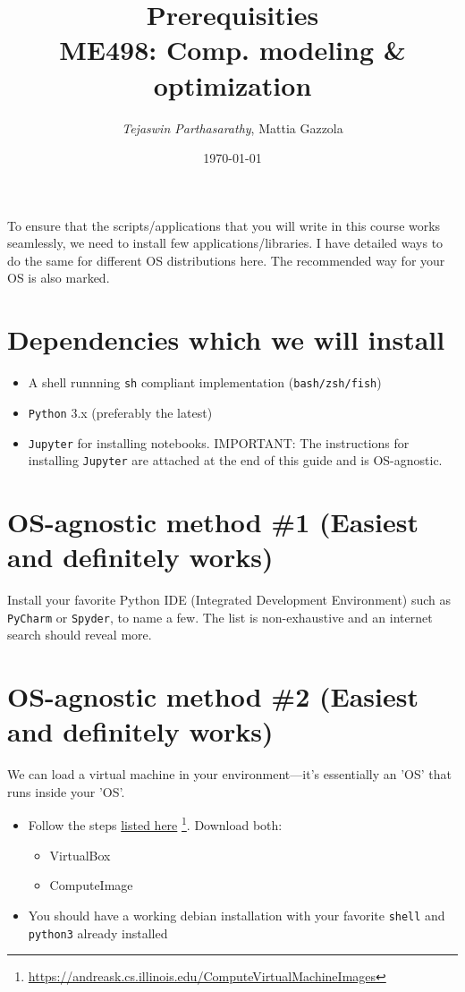 \documentclass[11pt]{article}
\author{\emph{Tejaswin Parthasarathy}, Mattia Gazzola}
\date{\today}
\title{Prerequisities\\\medskip
\large ME498: Comp. modeling \& optimization}
\begin{document}
\maketitle
To ensure that the scripts/applications that you will write in this course works
seamlessly, we need to install few applications/libraries. I have detailed ways
to do the same for different OS distributions here. The recommended way for your
OS is also marked.

\section*{Dependencies which we will install}
\label{sec:orgf10cae7}
\begin{itemize}
\item A shell runnning \texttt{sh} compliant implementation (\texttt{bash/zsh/fish})
\item \texttt{Python} 3.x (preferably the latest)
\item \texttt{Jupyter} for installing notebooks. IMPORTANT: The instructions for installing
\texttt{Jupyter} are attached at the end of this guide and is OS-agnostic.
\end{itemize}

\section*{OS-agnostic method \#1 (Easiest and definitely works)}
\label{sec:orgcf2bf2d}
Install your favorite Python IDE (Integrated Development Environment) such as
\texttt{PyCharm} or \texttt{Spyder}, to name a few. The list is non-exhaustive and an internet search
should reveal more.
\section*{OS-agnostic method \#2 (Easiest and definitely works)}
\label{sec:org6c3df1d}
We can load a virtual machine in your environment---it's essentially an 'OS' that
runs inside your 'OS'.
\begin{itemize}
\item Follow the steps \href{https://andreask.cs.illinois.edu/ComputeVirtualMachineImages}{listed here} \footnote{\url{https://andreask.cs.illinois.edu/ComputeVirtualMachineImages}}. Download both:
\label{sec:org5fedc5a}
\begin{itemize}
\item VirtualBox
\label{sec:orgfde6a76}
\item ComputeImage
\label{sec:orgdc8de05}
\end{itemize}
\item You should have a working debian installation with your favorite
\label{sec:orgadcc231}
\texttt{shell} and \texttt{python3} already installed
\end{itemize}
\end{document}
